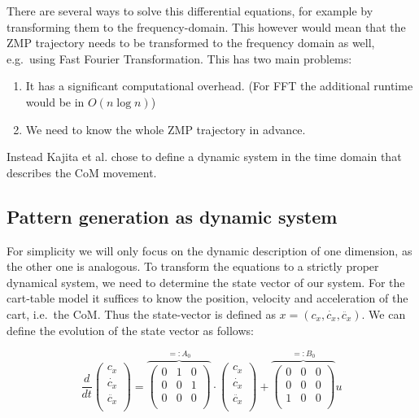 \documentclass[english,ngerman]{KITreprt}
\begin{document}
There are several ways to solve this differential equations, for example
by transforming them to the frequency-domain. This however would mean
that the ZMP trajectory needs to be transformed to the frequency domain
as well, e.g.~using Fast Fourier Transformation. This has two main
problems:

\begin{enumerate}
\def\labelenumi{\arabic{enumi}.}
\item
  It has a significant computational overhead. (For FFT the additional
  runtime would be in $O(n \log n)$)
\item
  We need to know the whole ZMP trajectory in advance.
\end{enumerate}

Instead Kajita et al. chose to define a dynamic system in the time
domain that describes the CoM movement.

\subsection{Pattern generation as dynamic
system}\label{pattern-generation-as-dynamic-system}

For simplicity we will only focus on the dynamic description of one
dimension, as the other one is analogous. To transform the equations to
a strictly proper dynamical system, we need to determine the state
vector of our system. For the cart-table model it suffices to know the
position, velocity and acceleration of the cart, i.e.~the CoM. Thus the
state-vector is defined as $x = (c_x, \dot{c_x}, \ddot{c_x})$. We can
define the evolution of the state vector as follows:

\begin{equation} \label{eq:dyn-system}
\frac{d}{dt} \left(\begin{array}{c}
c_x \\
\dot{c_x} \\
\ddot{c_x} \\
\end{array} \right)
=
\overbrace{
\left(\begin{array}{ccc}
0 & 1 & 0\\
0 & 0 & 1 \\
0 & 0 & 0 \\
\end{array}\right)
}^{ =: A_0}
\cdot
\left(\begin{array}{c}
c_x \\
\dot{c_x} \\
\ddot{c_x} \\
\end{array}\right)
+
\overbrace{
\left(\begin{array}{ccc}
0 & 0 & 0\\
0 & 0 & 0\\
1 & 0 & 0\\
\end{array}\right)
}^{ =: B_0}
u
\end{equation}
\end{document}
